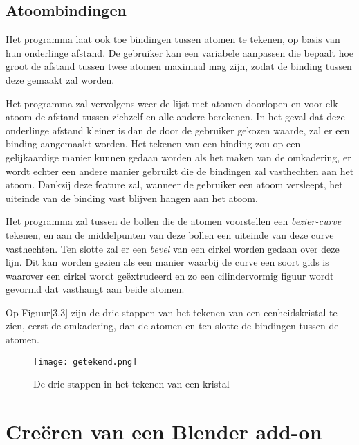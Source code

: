 \subsection{Atoombindingen}
Het programma laat ook toe bindingen tussen atomen te tekenen, op basis van hun onderlinge afstand. De gebruiker kan een variabele aanpassen die bepaalt hoe groot de afstand tussen twee atomen maximaal mag zijn, zodat de binding tussen deze gemaakt zal worden.
\par
Het programma zal vervolgens weer de lijst met atomen doorlopen en voor elk atoom de afstand tussen zichzelf en alle andere berekenen. In het geval dat deze onderlinge afstand kleiner is dan de door de gebruiker gekozen waarde, zal er een binding aangemaakt worden. Het tekenen van een binding zou op een gelijkaardige manier kunnen gedaan worden als het maken van de omkadering, er wordt echter een andere manier gebruikt die de bindingen zal vasthechten aan het atoom. Dankzij deze feature zal, wanneer de gebruiker een atoom versleept, het uiteinde van de binding vast blijven hangen aan het atoom.
\par
Het programma zal tussen de bollen die de atomen voorstellen een \textit{bezier-curve} tekenen, en aan de middelpunten van deze bollen een uiteinde van deze curve vasthechten. Ten slotte zal er een \textit{bevel} van een cirkel worden gedaan over deze lijn. Dit kan worden gezien als een manier waarbij de curve een soort gids is waarover een cirkel wordt geëxtrudeerd en zo een cilindervormig figuur wordt gevormd dat vasthangt aan beide atomen. 
\par
Op Figuur[3.3] zijn de drie stappen van het tekenen van een eenheidskristal te zien, eerst de omkadering, dan de atomen en ten slotte de bindingen tussen de atomen.
\begin{figure}[h]
\texttt{[image: getekend.png]}
\caption{De drie stappen in het tekenen van een kristal}
\end{figure}

\section{Creëren van een Blender add-on}

